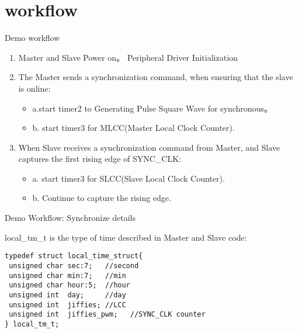 \section{workflow}

\begin{frame}[fragile]{Demo workflow}

\begin{enumerate}
\item Master and Slave Power on。 Peripheral Driver Initialization
\item The Master sends a synchronization command, when ensuring that the slave is online:
  \begin{itemize}
    \item a.start timer2 to Generating Pulse Square Wave for synchronous。
    \item b. start  timer3 for  MLCC(Master Local Clock Counter).
  \end{itemize}
\item When Slave receives a synchronization command from Master, and Slave captures the first rising edge of SYNC\_CLK:
  \begin{itemize}
    \item a.  start  timer3 for  SLCC(Slave Local Clock Counter).
    \item b. Continue to capture the rising edge.

  \end{itemize}


\end{enumerate}


\end{frame}


\begin{frame}[fragile]{Demo Workflow: Synchronize details}

local\_tm\_t is the type of time described in Master and Slave code:

\begin{lstlisting}
typedef struct local_time_struct{
 unsigned char sec:7;   //second
 unsigned char min:7;   //min
 unsigned char hour:5;  //hour
 unsigned int  day;     //day
 unsigned int  jiffies; //LCC
 unsigned int  jiffies_pwm;   //SYNC_CLK counter
} local_tm_t;
\end{lstlisting}



\end{frame}



